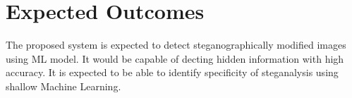 \chapter{Expected Outcomes}
The proposed system is expected to detect steganographically modified images using ML model. It would be capable of decting hidden information with high accuracy. It is expected to be able to identify specificity of steganalysis using shallow Machine Learning.




